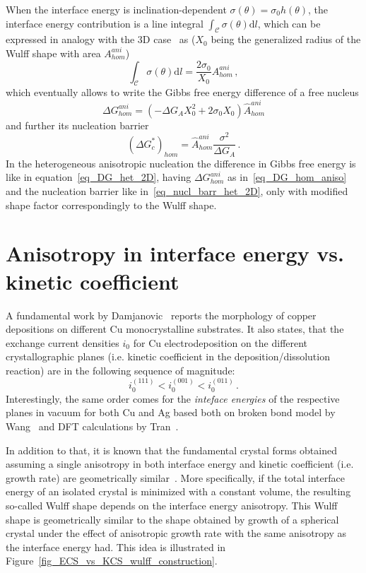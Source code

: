     When the interface energy is inclination-dependent $\sigma(\theta)=\sigma_0 h(\theta)$, the interface energy contribution is a line integral $\int_\mathcal{C} \sigma(\theta) \mathrm{d}l$, which can be expressed in analogy with the 3D case~\cite{Mariaux2011} as ($X_0$ being the generalized radius of the Wulff shape with area $A_{hom}^{ani}$)
    \begin{equation}
        \int_\mathcal{C} \sigma(\theta) \mathrm{d}l = \frac{2\sigma_0}{X_0}A_{hom}^{ani} \,,    
    \end{equation}
    which eventually allows to write the Gibbs free energy difference of a free nucleus
    \begin{equation}\label{eq_DG_hom_aniso}
        \Delta G_{hom}^{ani} = (-\Delta G_A X_0^2 + 2\sigma_0 X_0)\hat{A}_{hom}^{ani} 
    \end{equation}
    and further its nucleation barrier
    \begin{equation} 
        (\Delta G_c^*)_{hom} = \hat{A}_{hom}^{ani}\frac{\sigma^2}{\Delta G_A}\,.
    \end{equation}
    In the heterogeneous anisotropic nucleation the difference in Gibbs free energy is like in equation~\eqref{eq_DG_het_2D}, having $\Delta G_{hom}^{ani}$ as in~\eqref{eq_DG_hom_aniso} and the nucleation barrier like in~\eqref{eq_nucl_barr_het_2D}, only with modified shape factor correspondingly to the Wulff shape.
    
\section{Anisotropy in interface energy vs. kinetic coefficient}
A fundamental work by Damjanovic~\cite{Damjanovic1966} reports the morphology of copper depositions on different Cu monocrystalline substrates. It also states, that the exchange current densities $i_0$ for Cu electrodeposition on the different crystallographic planes (i.e. kinetic coefficient in the deposition/dissolution reaction) are in the following sequence of magnitude:
\begin{equation}
	i_0^{(111)}<i_0^{(001)}<i_0^{(011)} \,.
\end{equation}
Interestingly, the same order comes for the \textit{inteface energies} of the respective planes in vacuum for both Cu and Ag based both on broken bond model by Wang~\cite{Wang2000} and DFT calculations by Tran~\cite{Tran2016}. 

In addition to that, it is known that the fundamental crystal forms obtained assuming a single anisotropy in both interface energy and kinetic coefficient (i.e. growth rate) are geometrically similar~\cite{Kobayashi2001,Salvalaglio2015}. More specifically, if the total interface energy of an isolated crystal is minimized with a constant volume, the resulting so-called Wulff shape depends on the interface energy anisotropy. This Wulff shape is geometrically similar to the shape obtained by growth of a spherical crystal under the effect of anisotropic growth rate with the same anisotropy as the interface energy had. This idea is illustrated in Figure~\ref{fig_ECS_vs_KCS_wulff_construction}.

